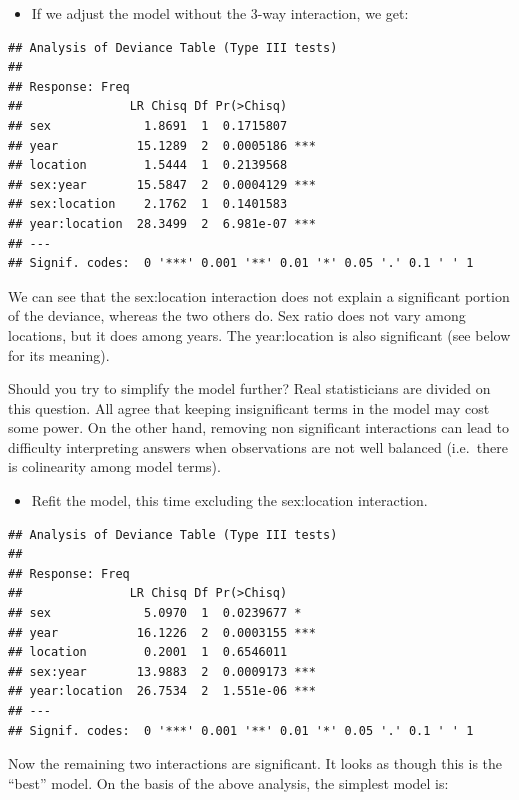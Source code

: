 \documentclass[
  12pt,
]{book}
\providecommand{\tightlist}{%
  \setlength{\itemsep}{0pt}\setlength{\parskip}{0pt}}
\begin{document}
\begin{itemize}
\tightlist
\item
  If we adjust the model without the 3-way interaction, we get:
\end{itemize}

\begin{verbatim}
## Analysis of Deviance Table (Type III tests)
## 
## Response: Freq
##               LR Chisq Df Pr(>Chisq)    
## sex             1.8691  1  0.1715807    
## year           15.1289  2  0.0005186 ***
## location        1.5444  1  0.2139568    
## sex:year       15.5847  2  0.0004129 ***
## sex:location    2.1762  1  0.1401583    
## year:location  28.3499  2  6.981e-07 ***
## ---
## Signif. codes:  0 '***' 0.001 '**' 0.01 '*' 0.05 '.' 0.1 ' ' 1
\end{verbatim}

We can see that the sex:location interaction does not explain a significant portion of the deviance, whereas the two others do. Sex ratio does not vary among locations, but it does among years. The year:location is also significant (see below for its meaning).

Should you try to simplify the model further? Real statisticians are divided on this question. All agree that keeping insignificant terms in the model may cost some power. On the other hand, removing non significant interactions can lead to difficulty interpreting answers when observations are not well balanced (i.e.~there is colinearity among model terms).

\begin{itemize}
\tightlist
\item
  Refit the model, this time excluding the sex:location interaction.
\end{itemize}

\begin{verbatim}
## Analysis of Deviance Table (Type III tests)
## 
## Response: Freq
##               LR Chisq Df Pr(>Chisq)    
## sex             5.0970  1  0.0239677 *  
## year           16.1226  2  0.0003155 ***
## location        0.2001  1  0.6546011    
## sex:year       13.9883  2  0.0009173 ***
## year:location  26.7534  2  1.551e-06 ***
## ---
## Signif. codes:  0 '***' 0.001 '**' 0.01 '*' 0.05 '.' 0.1 ' ' 1
\end{verbatim}

Now the remaining two interactions are significant. It looks as though this is the ``best'' model. On the basis of the above analysis, the simplest model is:
\end{document}
